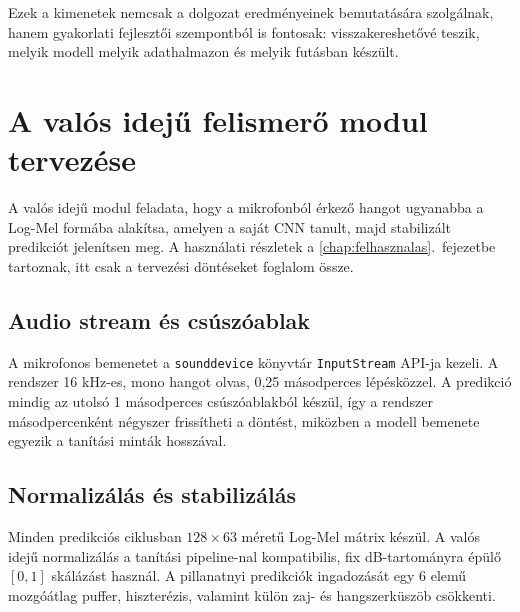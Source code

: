 Ezek a kimenetek nemcsak a dolgozat eredményeinek bemutatására szolgálnak, hanem gyakorlati fejlesztői szempontból is fontosak: visszakereshetővé teszik, melyik modell melyik adathalmazon és melyik futásban készült.

\section{A valós idejű felismerő modul tervezése}
\label{sec:realtime}

A valós idejű modul feladata, hogy a mikrofonból érkező hangot ugyanabba a Log-Mel formába alakítsa, amelyen a saját CNN tanult, majd stabilizált predikciót jelenítsen meg. A használati részletek a \ref{chap:felhasznalas}.~fejezetbe tartoznak, itt csak a tervezési döntéseket foglalom össze.

\subsection{Audio stream és csúszóablak}

A mikrofonos bemenetet a \texttt{sounddevice} könyvtár \texttt{InputStream} API-ja kezeli. A rendszer 16 kHz-es, mono hangot olvas, 0,25 másodperces lépésközzel. A predikció mindig az utolsó 1 másodperces csúszóablakból készül, így a rendszer másodpercenként négyszer frissítheti a döntést, miközben a modell bemenete egyezik a tanítási minták hosszával.

\subsection{Normalizálás és stabilizálás}

Minden predikciós ciklusban $128 \times 63$ méretű Log-Mel mátrix készül. A valós idejű normalizálás a tanítási pipeline-nal kompatibilis, fix dB-tartományra épülő $[0,1]$ skálázást használ. A pillanatnyi predikciók ingadozását egy 6 elemű mozgóátlag puffer, hiszterézis, valamint külön zaj- és hangszerküszöb csökkenti.


